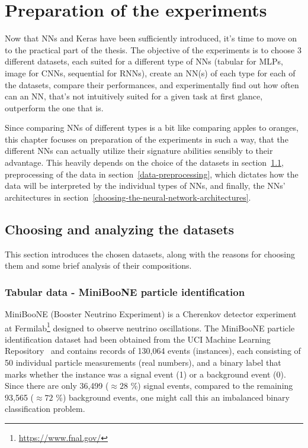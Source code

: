 \chapter{Preparation of the experiments}
\label{preparation-of-the-experiments}
Now that NNs and Keras have been sufficiently introduced, it's time to move on to the practical part of the
thesis. The objective of the experiments is to choose 3 different datasets, each suited for a different type
of NNs (tabular for MLPs, image for CNNs, sequential for RNNs), create an NN(s) of each type for each of the
datasets, compare their performances, and experimentally find out how often can an NN, that's not intuitively suited
for a given task at first glance, outperform the one that is.

Since comparing NNs of different types is a bit like comparing apples to oranges, this chapter
focuses on preparation of the experiments in such a way, that the different NNs can actually
utilize their signature abilities sensibly to their advantage. This heavily depends on the choice of the datasets
in section~\ref{choosing-and-analyzing-the-datasets}, preprocessing of the data in section~\ref{data-preprocessing},
which dictates how the data will be interpreted by the individual types of NNs, and finally, the NNs' architectures
in section~\ref{choosing-the-neural-network-architectures}.




\section{Choosing and analyzing the datasets}
\label{choosing-and-analyzing-the-datasets}
This section introduces the chosen datasets, along with the reasons for choosing them and some brief analysis of their compositions.


\subsection{Tabular data - MiniBooNE particle identification}
\label{dataset-tabular}
MiniBooNE (Booster Neutrino Experiment) is a Cherenkov detector experiment at
Fermilab\footnote{\url{https://www.fnal.gov/}} designed to observe neutrino 
oscillations. The MiniBooNE particle identification dataset had been obtained from the UCI Machine Learning
Repository~\cite{Dua:2019}
and contains records of 130,064 events (instances), each consisting of 50 individual particle measurements
(real numbers), and a
binary label that marks whether the instance was a signal event (1) or a background event (0). Since there are only
36,499 ($\approx 28$ \%) signal events, compared to the remaining 93,565 ($\approx 72$ \%) background events,
one might call this an imbalanced binary classification problem.

